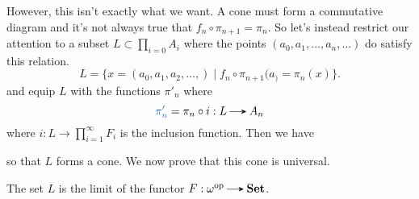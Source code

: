 \begin{example}
\begin{center}
        \end{center}
        However, this isn't exactly what we want. A cone must
        form a commutative diagram and it's not always true
        that $f_n \circ \pi_{n+1} = \pi_n$. So let's instead restrict 
        our attention to a subset $\displaystyle L \subset \prod_{i = 0}A_i$ 
        where the points $(a_0, a_1, \dots, a_n, \dots)$ do satisfy this relation.
        \[
            L = \big\{x = (a_0, a_1, a_2, \dots,) 
            \mid f_{n}\circ \pi_{n+1}(a_) = \pi_n(x) \big\}.
        \]
        and equip $L$ with the functions $\pi'_{n}$ where 
        \[
            \textcolor{NavyBlue}{\pi'_n} = \pi_n \circ i  : L \to A_n
        \]
        where $i: L \to \prod\limits_{i = 1}^{\infty} F_i$ is the
        inclusion function. Then we have
        \begin{center}
        \end{center}
        so that $L$ forms a cone. We now prove that this cone is universal. 

    \begin{lemma}
        The set $L$ is the limit of the functor $F: \omega\op \to \textbf{Set}$.
    \end{lemma}


\end{example}
